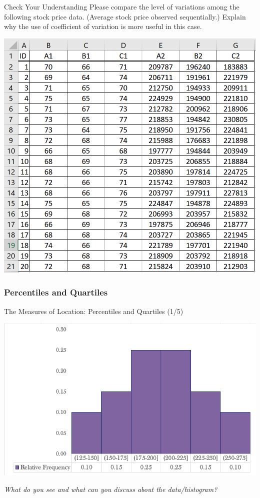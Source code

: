 \documentclass{beamer}
\begin{document}
\begin{frame}{Check Your Understanding}
Please compare the level of variations among the following stock price data. (Average stock price observed sequentially.) Explain why the use of coefficient of variation is more useful in this case.


\begin{center}
\includegraphics[scale=0.4]{images/ch2StockData.png}

\end{center}
\end{frame}


\subsubsection{Percentiles and Quartiles}
\begin{frame}{The Measures of Location: Percentiles and Quartiles (1/5)}

\begin{center}
\includegraphics[scale=0.5]{images/ch2PercentilesNaked.png}
\end{center}

\begin{center}
\textit{What do you see and what can you discuss about the data/histogram?
}
\end{center}
\end{frame}
\end{document}
